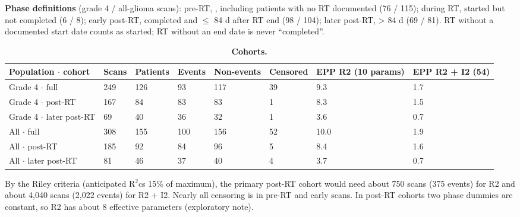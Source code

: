 \documentclass[11pt,a4paper]{article}
\begin{document}
\textbf{Phase definitions} (grade 4 / all-glioma scans): pre-RT, , including
patients
with no RT documented (76 / 115); during RT, started but not completed (6 / 8); early post-RT, completed and
$\leq$ 84 d after RT end (98 / 104); later post-RT, > 84 d (69 / 81). RT without a documented start date
counts as started; RT without an end date is never ``completed''.

\begin{table}[H]
\centering
\footnotesize
\renewcommand{\thetable}{S15}\renewcommand{\theHtable}{S15}
\caption{\textbf{Cohorts.}}
\label{tab:S15}
\begin{tabularx}{\linewidth}{@{}L R{0.78cm} R{1.24cm} R{0.93cm} R{1.55cm} R{1.24cm} R{2.20cm} R{2.20cm}@{}}
\toprule
Population $\cdot$ cohort & Scans & Patients & Events & Non-events & Censored & EPP R2 (10 params) & EPP R2 + I2 (54) \\
\midrule
Grade 4 $\cdot$ full & 249 & 126 & 93 & 117 & 39 & 9.3 & 1.7 \\
Grade 4 $\cdot$ post-RT & 167 & 84 & 83 & 83 & 1 & 8.3 & 1.5 \\
Grade 4 $\cdot$ later post-RT & 69 & 40 & 36 & 32 & 1 & 3.6 & 0.7 \\
All $\cdot$ full & 308 & 155 & 100 & 156 & 52 & 10.0 & 1.9 \\
All $\cdot$ post-RT & 185 & 92 & 84 & 96 & 5 & 8.4 & 1.6 \\
All $\cdot$ later post-RT & 81 & 46 & 37 & 40 & 4 & 3.7 & 0.7 \\
\bottomrule
\end{tabularx}
\end{table}

By the Riley criteria (anticipated R$^{2}$cs 15\% of maximum), the primary post-RT cohort would need about 750
scans (375 events) for R2 and about 4,040 scans (2,022 events) for R2 + I2. Nearly all censoring is in pre-RT
and early scans. In post-RT cohorts two phase dummies are constant, so R2 has about 8 effective parameters
(exploratory note).
\end{document}
